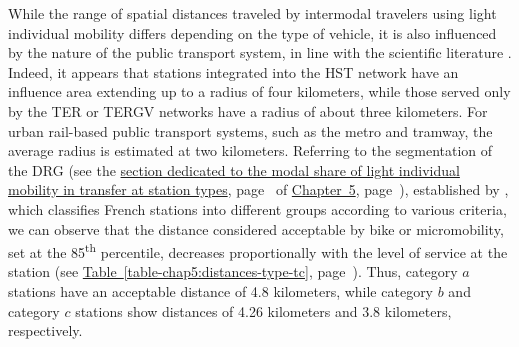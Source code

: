 \begin{refsegment}
While the range of spatial distances traveled by intermodal travelers using light individual mobility differs depending on the type of vehicle, it is also influenced by the nature of the public transport system, in line with the scientific literature \textcolor{blue}{\autocite[105]{flamm_public_2014}}. Indeed, it appears that stations integrated into the \acrshort{HST} network have an influence area extending up to a radius of four kilometers, while those served only by the \acrshort{TER} or \acrshort{TERGV} networks have a radius of about three kilometers. For urban rail-based public transport systems, such as the metro and tramway, the average radius is estimated at two kilometers. Referring to the segmentation of the \acrfull{DRG} (see the \hyperref[chap4:part-modale-gares-centre-periurbain]{section dedicated to the modal share of light individual mobility in transfer at station types}, page~\pageref{chap4:part-modale-gares-centre-periurbain} of \hyperref[chap5:titre]{Chapter~5}, page~\pageref{chap5:titre}), established by \textcolor{blue}{\textcite{sncf_gares__connexions_gares_2024}}, which classifies French stations into different groups according to various criteria, we can observe that the distance considered acceptable by bike or micromobility, set at the 85\textsuperscript{th} percentile, decreases proportionally with the level of service at the station (see \hyperref[table-chap5:distances-type-tc]{Table~\ref{table-chap5:distances-type-tc}}, page~\pageref{table-chap5:distances-type-tc}). Thus, category \(a\) stations have an acceptable distance of 4.8 kilometers, while category \(b\) and category \(c\) stations show distances of 4.26 kilometers and 3.8 kilometers, respectively.%



\end{refsegment}
